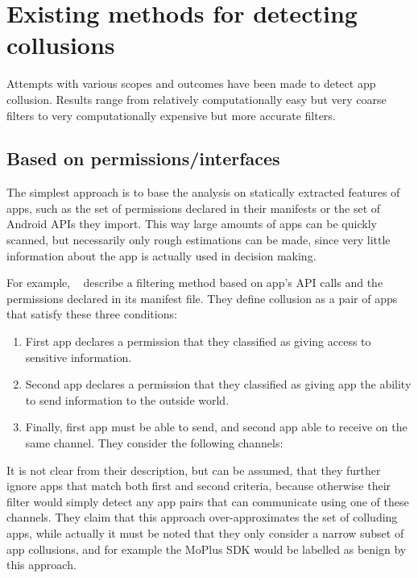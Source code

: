 \documentclass[article, oneside]{aaltoseries}
\begin{document}
\section{Existing methods for detecting collusions}
\label{sec:approaches}

Attempts with various scopes and outcomes have been made to detect app collusion. Results range from relatively computationally easy but very coarse filters to very computationally expensive but more accurate filters. 

\subsection{Based on permissions/interfaces}

The simplest approach is to base the analysis on statically extracted features of apps, such as the set of permissions declared in their manifests or the set of Android APIs they import. This way large amounts of apps can be quickly scanned, but necessarily only rough estimations can be made, since very little information about the app is actually used in decision making.

For example, \citeauthor{Asavoae2016}~\cite{Asavoae2016} describe a filtering method based on app's API calls and the permissions declared in its manifest file. They define collusion as a pair of apps that satisfy these three conditions:
\begin{enumerate}
	\item First app declares a permission that they classified as giving access to sensitive information.
	\item Second app declares a permission that they classified as giving app the ability to send information to the outside world.
	\item Finally, first app must be able to send, and second app able to receive on the same channel. They consider the following channels:
\end{enumerate}
It is not clear from their description, but can be assumed, that they further ignore apps that match both first and second criteria, because otherwise their filter would simply detect any app pairs that can communicate using one of these channels. They claim that this approach over-approximates the set of colluding apps, while actually it must be noted that they only consider a narrow subset of app collusions, and for example the MoPlus SDK would be labelled as benign by this approach.
\end{document}
